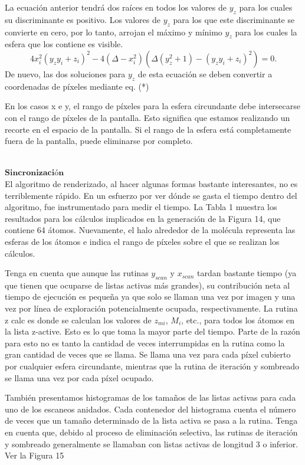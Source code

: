 La ecuación anterior tendrá dos raíces en todos los valores de $ y_z $ para los cuales su discriminante es positivo. Los valores de $ y_z $ para los que este discriminante se convierte en cero, por lo tanto, arrojan el máximo y mínimo $ y_z $ para los cuales la esfera que los contiene es visible.
\[
	4 x^{2}_{i}(y_z y_i + z_i)^2 - 4(\Delta - x^{2}_{i})(\Delta (y^{2}_{z} +1) - (y_z y_i + z_i)^2 ) = 0.
\]
De nuevo, las dos soluciones para $ y_z $ de esta ecuación se deben convertir a coordenadas de píxeles mediante eq. (*)

En los casos x e y, el rango de píxeles para la esfera circundante debe intersecarse con el rango de píxeles de la pantalla. Esto significa que estamos realizando un recorte en el espacio de la pantalla. Si el rango de la esfera está completamente fuera de la pantalla, puede eliminarse por completo.

${ }$\\
$\textbf{Sincronización}$
${ }$\\

El algoritmo de renderizado, al hacer algunas formas bastante interesantes, no es terriblemente rápido. En un esfuerzo por ver dónde se gasta el tiempo dentro del algoritmo, fue instrumentado para medir el tiempo. La Tabla 1 muestra los resultados para los cálculos implicados en la generación de la Figura 14, que contiene 64 átomos. Nuevamente, el halo alrededor de la molécula representa las esferas de los átomos e indica el rango de píxeles sobre el que se realizan los cálculos.

Tenga en cuenta que aunque las rutinas $y_ {scan}$ y $x_ {scan}$ tardan bastante tiempo (ya que tienen que ocuparse de listas activas más grandes), su contribución neta al tiempo de ejecución es pequeña ya que solo se llaman una vez por imagen y una vez por línea de exploración potencialmente ocupada, respectivamente. La rutina z calc es donde se calculan los valores de $z_ {mi}$, $M_i$, etc., para todos los átomos en la lista z-active. Esto es lo que toma la mayor parte del tiempo. Parte de la razón para esto no es tanto la cantidad de veces interrumpidas en la rutina como la gran cantidad de veces que se llama. Se llama una vez para cada píxel cubierto por cualquier esfera circundante, mientras que la rutina de iteración y sombreado se llama una vez por cada píxel ocupado.

También presentamos histogramas de los tamaños de las listas activas para cada uno de los escaneos anidados. Cada contenedor del histograma cuenta el número de veces que un tamaño determinado de la lista activa se pasa a la rutina. Tenga en cuenta que, debido al proceso de eliminación selectiva, las rutinas de iteración y sombreado generalmente se llamaban con listas activas de longitud 3 o inferior. Ver la Figura 15


